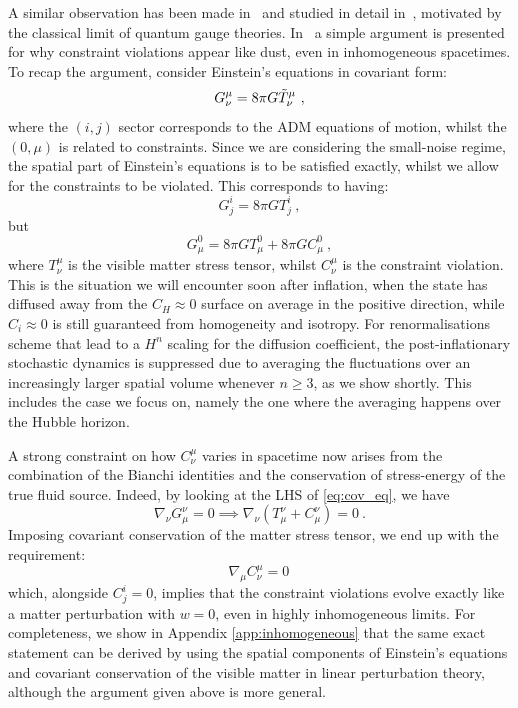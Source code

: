 \documentclass[amsmath,amssymb,11pt]{article}
\begin{document}
A similar observation has been made in~\cite{burns2023time,kaplan2023classical} and studied in detail in~\cite{casadio2024relaxation,delgrosso2024cosmological}, motivated by  the classical limit of quantum gauge theories. In~\cite{kaplan2023classical} a simple argument is presented for why constraint violations appear like dust, even in inhomogeneous spacetimes. To recap the argument, consider Einstein's equations in covariant form:
\begin{equation}
\label{eq:cov_eq}
    G^{\mu}_\nu = 8\pi G \Tilde{T}^{\mu}_\nu \ ,
\end{equation}
where the $(i,j)$ sector corresponds to the ADM equations of motion, whilst the $(0,\mu)$ is related to constraints. Since we are considering the small-noise regime, the spatial part of Einstein's equations is to be satisfied exactly, whilst we allow for the constraints to be violated. This corresponds to having:
\begin{equation}
    G^i_j = 8\pi G T^{i}_{ j} \ , 
\end{equation}
but
\begin{equation}
    G^{0}_\mu = 8\pi G T^{0}_{\mu} + 8\pi G C^{ 0}_{\mu}  \ , 
\end{equation}
where $T^{\mu}_{\nu}$ is the visible matter stress tensor, whilst $C^\mu_\nu$ is the constraint violation. This is the situation we will encounter soon after inflation, when the state has diffused away from the $C_H\approx 0$ surface on average in the positive direction, while $C_i\approx 0$ is still guaranteed from homogeneity and isotropy. For renormalisations scheme that lead to a $H^n$ scaling for the diffusion coefficient, the post-inflationary stochastic dynamics is suppressed due to averaging the fluctuations over an increasingly larger spatial volume whenever $n\geq 3$, as we show shortly. This includes the case we focus on, namely the one where the averaging happens over the Hubble horizon. 

A strong constraint on how $C^\mu_\nu$ varies in spacetime now arises from the combination of the Bianchi identities and the conservation of stress-energy of the true fluid source. Indeed, by looking at the LHS of \eqref{eq:cov_eq}, we have
\begin{equation}
    \nabla_\nu G^{\nu}_\mu = 0 \implies \nabla_\nu(T^\nu_\mu + C^\nu_\mu) = 0 \ .
\end{equation}
Imposing covariant conservation of the matter stress tensor, we end up with the requirement:
\begin{equation}
    \nabla_\mu C^\mu_\nu = 0 \,
\end{equation}
which, alongside $C^i_j=0$, implies that the constraint violations evolve exactly like a matter perturbation with $w=0$, even in highly inhomogeneous limits. For completeness, we show in Appendix \ref{app:inhomogeneous} that the same exact statement can be derived by using the spatial components of Einstein's equations and covariant conservation of the visible matter in linear perturbation theory, although the argument given above is more general.
\end{document}
